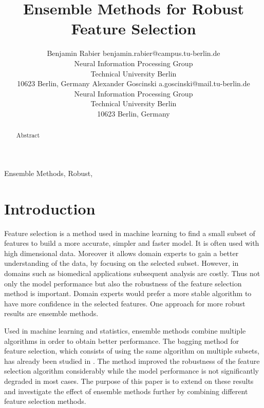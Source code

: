 \documentclass[twoside,11pt]{article}
\begin{document}
\title{Ensemble Methods for Robust Feature Selection}
\author{\name Benjamin Rabier \email benjamin.rabier@campus.tu-berlin.de \\
       \addr Neural Information Processing Group\\
       Technical University Berlin\\
       10623 Berlin, Germany
       \AND
       \name Alexander Goscinski \email a.goscinski@mail.tu-berlin.de \\
       \addr Neural Information Processing Group\\
       Technical University Berlin\\
       10623 Berlin, Germany}


\maketitle

\begin{abstract}%
  Abstract
\end{abstract}

\begin{keywords}
  Ensemble Methods, Robust, 
\end{keywords}

\section{Introduction}

Feature selection is a method used in machine learning to find a small subset of features to build a more accurate, simpler and faster model. It is often used with high dimensional data. Moreover it allows domain experts to gain a better understanding of the data, by focusing on the selected subset. However, in domains such as biomedical applications subsequent analysis are costly. Thus not only the model performance but also the robustness of the feature selection method is important. Domain experts would prefer a more stable algorithm to have more confidence in the selected features. One approach for more robust results are ensemble methods.

Used in machine learning and statistics, ensemble methods combine multiple algorithms in order to obtain better performance. The bagging method for feature selection, which consists of using the same algorithm on multiple subsets, has already been studied in \cite{saeys2008}. The method improved the robustness of the feature selection algorithm considerably while the model performance is not significantly degraded in most cases. The purpose of this paper is to extend on these results and investigate the effect of ensemble methods further by combining different feature selection methods.
\end{document}
